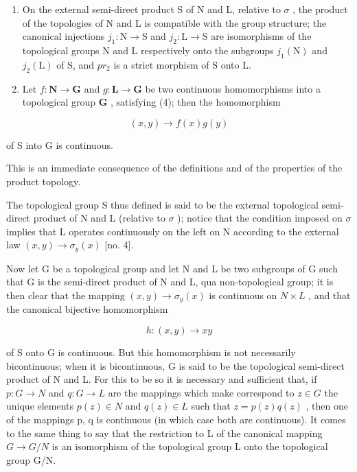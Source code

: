 \begin{enumerate}
\def\labelenumi{\arabic{enumi})}
\item
  On the external semi-direct product S of N and L, relative to \(\sigma\) , the product of the topologies of N and L is compatible with the group structure; the canonical injections \(j_{1}: \mathrm{N} \to \mathrm{S}\) and \(j_{2}: \mathrm{L} \to \mathrm{S}\) are isomorphisms of the topological groups N and L respectively onto the subgroups \(j_{1}(\mathrm{N})\) and \(j_{2}(\mathrm{L})\) of S, and \(pr_{2}\) is a strict morphism of S onto L.
\item
  Let \(f: \mathbf{N} \to \mathbf{G}\) and \(g: \mathbf{L} \to \mathbf{G}\) be two continuous homomorphisms into a topological group \(\mathbf{G}\) , satisfying (4); then the homomorphism
\end{enumerate}

\[
(x, y) \rightarrow f (x) g (y)
\]

of S into G is continuous.

This is an immediate consequence of the definitions and of the properties of the product topology.

The topological group S thus defined is said to be the external topological semi-direct product of N and L (relative to \(\sigma\) ); notice that the condition imposed on \(\sigma\) implies that L operates continuously on the left on N according to the external law \((x, y) \to \sigma_{y}(x)\) {[}no. 4{]}.

Now let G be a topological group and let N and L be two subgroups of G such that G is the semi-direct product of N and L, qua non-topological group; it is then clear that the mapping \((x, y) \to \sigma_{y}(x)\) is continuous on \(N \times L\) , and that the canonical bijective homomorphism

\[
h: (x, y) \rightarrow x y
\]

of S onto G is continuous. But this homomorphism is not necessarily bicontinuous; when it is bicontinuous, G is said to be the topological semi-direct product of N and L. For this to be so it is necessary and sufficient that, if \(p: G \to N\) and \(q: G \to L\) are the mappings which make correspond to \(z \in G\) the unique elements \(p(z) \in N\) and \(q(z) \in L\) such that \(z = p(z)q(z)\) , then one of the mappings p, q is continuous (in which case both are continuous). It comes to the same thing to say that the restriction to L of the canonical mapping \(G \to G/N\) is an isomorphism of the topological group L onto the topological group G/N.

